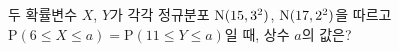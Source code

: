 두 확률변수 $X$, $Y$가 각각 정규분포 $\mathrm{N}(15{,}\mkern3mu\mathopen{}3^2)$, $\mathrm{N}(17{,}\mkern3mu\mathopen{}2^2)$을 따르고 $\mathrm{P}(6\le X\le a)=\mathrm{P}(11\le Y\le a)$일 때, 상수 $a$의 값은?
